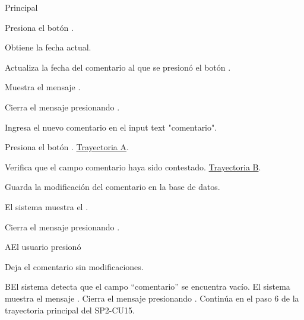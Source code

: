 \begin{UCtrayectoria}{Principal}


    \UCpaso[\UCactor] Presiona el botón . 
    
    \UCpaso Obtiene la fecha actual. 
    
    \UCpaso Actualiza la fecha del comentario al que se presionó el botón .
    
    \UCpaso Muestra el mensaje .

    \UCpaso[\UCactor] Cierra el mensaje presionando .
    
    \UCpaso[\UCactor] Ingresa el nuevo comentario en el input text "comentario".
    
    \UCpaso[\UCactor] Presiona el botón . \hyperref[SP2-CU15-A]{Trayectoria A}.
    
    \UCpaso Verifica que el campo comentario haya sido contestado. \hyperref[SP2-CU15-B]{Trayectoria B}.

    \UCpaso Guarda la modificación del comentario en la base de datos.

    \UCpaso El sistema muestra el  .

    \UCpaso[\UCactor] Cierra el mensaje presionando .


\end{UCtrayectoria}


\label{SP2-CU15-A}
\begin{UCtrayectoriaA}{A}{El usuario presionó }

  \UCpaso Deja el comentario sin modificaciones.
\end{UCtrayectoriaA}

\label{SP2-CU15-B}
\begin{UCtrayectoriaA}{B}{El sistema detecta que el campo “comentario” se encuentra vacío.} 
    \UCpaso El sistema muestra el mensaje .
    \UCpaso[\UCactor] Cierra el mensaje presionando .
    \UCpaso Continúa en el paso 6 de la trayectoria principal del SP2-CU15.
\end{UCtrayectoriaA}


